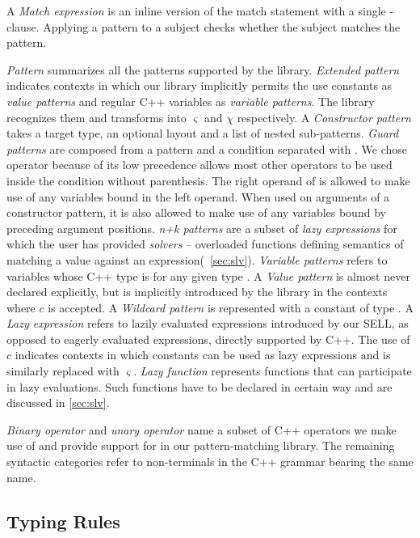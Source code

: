 A \emph{Match expression} is an inline version of the match statement with 
a single -clause. Applying a pattern to a subject checks whether the 
subject matches the pattern.

\emph{Pattern} summarizes all the patterns supported by the library. 
\emph{Extended pattern} indicates contexts in which our library implicitly 
permits the use constants as \emph{value patterns} and regular C++ variables as 
\emph{variable patterns}. The library recognizes them and transforms into 
$\varsigma$ and $\chi$ respectively.
A \emph{Constructor pattern} takes a target type, an optional layout and a list of 
nested sub-patterns.
\emph{Guard patterns} are composed from a pattern and a condition separated with 
\code{|=}.
We chose operator \code{|=} because of its low precedence 
allows most other operators to be used inside the 
condition without parenthesis. The right operand of \code{|=} is allowed to make use of any 
variables bound in the left operand. When used on arguments of a constructor 
pattern, it is also allowed to make use of any variables bound by preceding 
argument positions. 
\emph{n+k patterns} are a subset of \emph{lazy expressions} for which the user has 
provided \emph{solvers} -- overloaded functions defining semantics of matching a 
value against an expression(\textsection~\ref{sec:slv}).
\emph{Variable patterns} refers to variables whose C++ type is  for 
any given type .
A \emph{Value pattern} is almost never declared explicitly, 
but is implicitly introduced by the library in the contexts where $c$ is 
accepted.
A \emph{Wildcard pattern} is represented with a constant of type 
.
A \emph{Lazy expression} refers to lazily evaluated expressions introduced by our SELL, 
as opposed to eagerly evaluated expressions, directly supported by C++. The use 
of $c$ indicates contexts in which constants can be used as lazy expressions and 
is similarly replaced with $\varsigma$. \emph{Lazy function} represents 
functions that can participate in lazy evaluations. Such functions have to be 
declared in certain way and are discussed in \textsection\ref{sec:slv}. 

\emph{Binary operator} and \emph{unary operator} name a subset of C++ operators we 
make use of and provide support for in our pattern-matching library. 
The remaining syntactic categories refer to non-terminals in the C++ grammar 
bearing the same name.

\subsection{Typing Rules}

